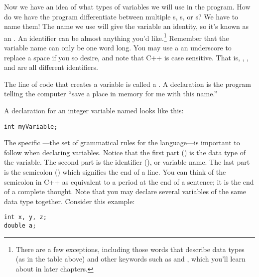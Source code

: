 Now we have an idea of what types of variables we will use in the program. 
How do we have the program differentiate between multiple s, s, or s? 
We have to name them! 
The name we use will give the variable an identity, so it's known as an . 
An identifier can be almost anything you'd like.\footnote{There are a few exceptions, including those words that describe data types (as in the table above) and other keywords such as  and , which you'll learn about in later chapters.} 
Remember that the variable name can only be one word long. 
You may use a an underscore to replace a space if you so desire, and note that C++ is case sensitive. 
That is, , , and  are all different identifiers.


The line of code that creates a variable is called a . 
A declaration is the program telling the computer ``save a place in memory for me with this name.'' 

A declaration for an integer variable named  looks like this:

\noindent\begin{minipage}{\linewidth}\begin{lstlisting}
int myVariable;
\end{lstlisting}\end{minipage}

The specific ---the set of grammatical rules for the language---is important to follow when declaring variables.
Notice that the first part () is the data type of the variable.
The second part is the identifier (), or variable name. 
The last part is the semicolon (\Code{;}) which signifies the end of a line. 
You can think of the semicolon in C++ as equivalent to a period at the end of a sentence; it is the end of a complete thought. 
Note that you may declare several variables of the same data type together.  Consider this example:

\noindent\begin{minipage}{\linewidth}\begin{lstlisting}
int x, y, z;
double a;
\end{lstlisting}\end{minipage}

